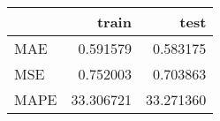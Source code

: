 \begin{tabular}{lrr}
\toprule
{} &      train &       test \\
\midrule
MAE  &   0.591579 &   0.583175 \\
MSE  &   0.752003 &   0.703863 \\
MAPE &  33.306721 &  33.271360 \\
\bottomrule
\end{tabular}
